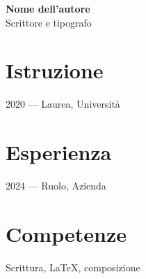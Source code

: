\documentclass[11pt]{article}
\begin{document}
{\Large\bfseries Nome dell'autore}\\[4pt]
{\large Scrittore e tipografo}

\vspace{8pt}

\section*{Istruzione}
2020 — Laurea, Università

\section*{Esperienza}
2024 — Ruolo, Azienda

\section*{Competenze}
Scrittura, LaTeX, composizione
\end{document}
